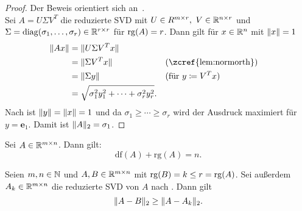 \begin{proof}
    Der Beweis orientiert sich an~\cite[7]{frazzoliDynamicSystemsControl2011}.\\
    Sei \(A = U\Sigma V^{T}\) die reduzierte SVD mit \(U \in R^{m \times r},\ V \in \R^{n \times r}\) und \(\Sigma=\operatorname{diag}(\sigma_{1},\ldots,\sigma_{r}) \in \mathbb{R}^{r \times r}\) für \(\operatorname{rg}(A) = r\).
    Dann gilt für \(x \in \mathbb{R}^{n}\) mit \(\lVert x\rVert = 1\)  
    \begin{align*}
        \norm{Ax} &= \norm{U\Sigma V^{T}x} \\
        &= \norm{\Sigma V^{T}x} \qquad &&(\text{\zcref{lem:normorth}}) \\
        &= \norm{\Sigma y} &&(\text{für } y \coloneqq V^{T}x) \\
        &= \sqrt{\sigma_{1}^{2}y_{1}^{2} + \cdots + \sigma_{r}^{2}y_{r}^{2}}.
    \end{align*}
    Nach  ist \(\lVert y\rVert = \lVert x\rVert = 1\) und da \(\sigma_{1} \geq \cdots \geq \sigma_{r}\) wird der Ausdruck maximiert für \(y = \symbf{e}_{1}\).
    Damit ist \(\lVert A\rVert_{2} = \sigma_{1}\).    
\end{proof}
\begin{repitition}[Dimensionssatz]\label{rep:dim}
    Sei \(A \in \mathbb{R}^{m \times n}\). Dann gilt:
    \begin{equation*}
        \text{df}(A) + \text{rg}(A) = n.
    \end{equation*} 
\end{repitition}
\begin{theorem}
    Seien \(m,n \in \mathbb{N}\) und \(A,B \in \mathbb{R}^{m \times n}\) mit \(\operatorname{rg}(B) = k \leq r = \operatorname{rg}(A)\).
    Sei außerdem \(A_{k} \in \mathbb{R}^{m \times n}\) die reduzierte SVD von \(A\) nach .
    Dann gilt
    \begin{equation*}
        \lVert A-B\rVert_{2} \geq \lVert A - A_{k}\rVert_{2}.
    \end{equation*}   
\end{theorem}
